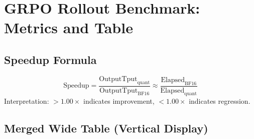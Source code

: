 \documentclass[11pt]{article}
\begin{document}
\section*{GRPO Rollout Benchmark: Metrics and Table}

\subsection*{Speedup Formula}
\[
\text{Speedup}=
\frac{\text{OutputTput}_{\text{quant}}}{\text{OutputTput}_{\text{BF16}}}
\approx
\frac{\text{Elapsed}_{\text{BF16}}}{\text{Elapsed}_{\text{quant}}}
\]
\noindent
Interpretation: $>1.00\times$ indicates improvement, $<1.00\times$ indicates regression.

\subsection*{Merged Wide Table (Vertical Display)}
\end{document}
